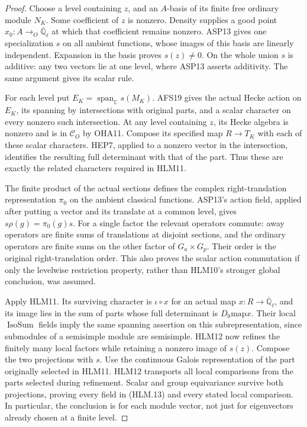 \begin{proof}
Choose a level containing \(z\), and an \(A\)-basis of
its finite free ordinary module \(N_K\).  Some coefficient
of \(z\) is nonzero.  Density supplies a good point
\(x_0:A\to_O\overline{\mathbb Q}_\ell\) at which that
coefficient remains nonzero.  ASP13 gives one specialization
\(s\) on all ambient functions, whose images of this basis
are linearly independent.  Expansion in the basis proves
\(s(z)\ne0\).  On the whole union \(s\) is additive:
any two vectors lie at one level, where ASP13 asserts
additivity.  The same argument gives its scalar rule.

For each level put \(E_K=\operatorname{span}_{\mathbb C}s(M_K)\).
AFS19 gives the actual Hecke action on \(E_K\), its spanning
by intersections with original parts, and a scalar character
on every nonzero such intersection.  At any level containing
\(z\), its Hecke algebra is nonzero and is in \(\mathcal C_O\)
by OHA11.  Compose its specified map \(R\to T_K\) with
each of these scalar characters.  HEP7, applied to a nonzero
vector in the intersection, identifies the resulting full
determinant with that of the part.  Thus these are exactly
the related characters required in HLM11.

The finite product of the actual sections defines the complex
right-translation representation \(\pi_0\) on the ambient
classical functions.  ASP13's action field, applied after
putting a vector and its translate at a common level, gives
\(s\rho(g)=\pi_0(g)s\).  For a single factor the relevant
operators commute: away operators are finite sums of translations
at disjoint sections, and the ordinary operators are finite
sums on the other factor of \(G_a\times G_p\).
Their order is the original right-translation order.  This
also proves the scalar action commutation if only the
levelwise restriction property, rather than HLM10's stronger
global conclusion, was assumed.

Apply HLM11.  Its surviving character is
\(\iota\circ x\) for an actual map \(x:R\to\overline{\mathbb Q}_\ell\),
and its image lies in the sum of parts whose full determinant
is \(D_0\mathbin{\mathrm{map}}x\).  Their local
\(\operatorname{IsoSum}\) fields imply the same spanning
assertion on this subrepresentation, since submodules of a
semisimple module are semisimple.  HLM12 now refines the
finitely many local factors while retaining a nonzero image
of \(s(z)\).  Compose the two projections with \(s\).
Use the continuous Galois representation of the part originally
selected in HLM11.  HLM12 transports all local comparisons
from the parts selected during refinement.  Scalar and group
equivariance survive both projections, proving every field
in (HLM.13) and every stated local comparison.  In particular,
the conclusion is for each module vector, not just for
eigenvectors already chosen at a finite level.
\end{proof}

